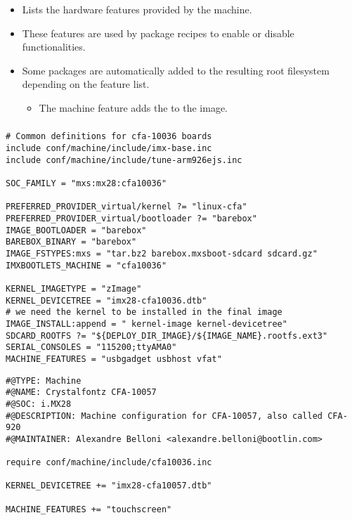 \begin{frame}
  \frametitle{}
  \begin{itemize}
    \item Lists the hardware features provided by the machine.
    \item These features are used by package recipes to enable or
      disable functionalities.
    \item Some packages are automatically added to the resulting root
    filesystem depending on the feature list.
      \begin{itemize}
        \item The machine feature  adds the 
          to the image.
      \end{itemize}
  \end{itemize}
\end{frame}

\begin{frame}[fragile]
  \frametitle{}
  \begin{block}{}
    \begin{verbatim}
# Common definitions for cfa-10036 boards
include conf/machine/include/imx-base.inc
include conf/machine/include/tune-arm926ejs.inc

SOC_FAMILY = "mxs:mx28:cfa10036"

PREFERRED_PROVIDER_virtual/kernel ?= "linux-cfa"
PREFERRED_PROVIDER_virtual/bootloader ?= "barebox"
IMAGE_BOOTLOADER = "barebox"
BAREBOX_BINARY = "barebox"
IMAGE_FSTYPES:mxs = "tar.bz2 barebox.mxsboot-sdcard sdcard.gz"
IMXBOOTLETS_MACHINE = "cfa10036"

KERNEL_IMAGETYPE = "zImage"
KERNEL_DEVICETREE = "imx28-cfa10036.dtb"
# we need the kernel to be installed in the final image
IMAGE_INSTALL:append = " kernel-image kernel-devicetree"
SDCARD_ROOTFS ?= "${DEPLOY_DIR_IMAGE}/${IMAGE_NAME}.rootfs.ext3"
SERIAL_CONSOLES = "115200;ttyAMA0"
MACHINE_FEATURES = "usbgadget usbhost vfat"
    \end{verbatim}
  \end{block}
\end{frame}

\begin{frame}[fragile]{}
  \begin{block}{}
    \begin{verbatim}
#@TYPE: Machine
#@NAME: Crystalfontz CFA-10057
#@SOC: i.MX28
#@DESCRIPTION: Machine configuration for CFA-10057, also called CFA-920
#@MAINTAINER: Alexandre Belloni <alexandre.belloni@bootlin.com>

require conf/machine/include/cfa10036.inc

KERNEL_DEVICETREE += "imx28-cfa10057.dtb"

MACHINE_FEATURES += "touchscreen"
    \end{verbatim}
  \end{block}
\end{frame}

